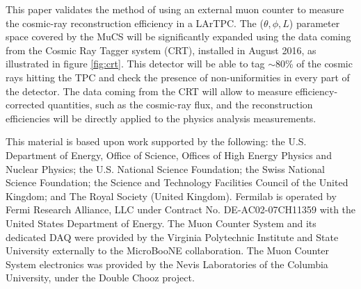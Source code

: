 \documentclass[a4paper,11pt]{article}
\begin{document}
This paper validates the method of using an external muon counter to measure the cosmic-ray reconstruction efficiency in a LArTPC. The ($\theta, \phi, L$) parameter space covered by the MuCS will be significantly expanded using the data coming from the Cosmic Ray Tagger system (CRT), installed in August 2016, as illustrated in figure \ref{fig:crt}. This detector will be able to tag $\sim$80\% of the cosmic rays hitting the TPC and check the presence of non-uniformities in every part of the detector. The data coming from the CRT will allow to measure efficiency-corrected quantities, such as the cosmic-ray flux, and the reconstruction efficiencies will be directly applied to the physics analysis measurements.



\clearpage{}

\acknowledgments

This material is based upon work supported by the following: the U.S. Department of Energy, Office of Science, Offices of High Energy Physics and Nuclear Physics; the U.S. National Science Foundation; the Swiss National Science Foundation; the Science and Technology Facilities Council of the United Kingdom; and The Royal Society (United Kingdom). Fermilab is operated by Fermi Research Alliance, LLC under Contract No. DE-AC02-07CH11359 with the United States Department of Energy. The Muon Counter System and its dedicated DAQ were provided by the Virginia Polytechnic Institute and State University externally to the MicroBooNE collaboration. The Muon Counter System electronics was provided by the Nevis Laboratories of the Columbia University, under the Double Chooz project.
\end{document}
